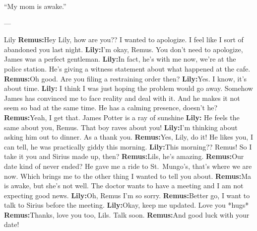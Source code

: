 \documentclass[12pt,twoside,openright]{memoir}
\begin{document}
``My mom is awake.''

---

Lily\newline
\textbf{Remus:}Hey Lily, how are you?? I wanted to apologize. I feel like I sort of abandoned you last night.\newline
\textbf{Lily:}I'm okay, Remus. You don't need to apologize, James was a perfect gentleman.\newline
\textbf{Lily:}In fact, he's with me now, we're at the police station. He's giving a witness statement about what happened at the cafe.\newline
\textbf{Remus:}Oh good. Are you filing a restraining order then?\newline
\textbf{Lily:}Yes. I know, it's about time. \newline
\textbf{Lily:} I think I was just hoping the problem would go away. Somehow James has convinced me to face reality and deal with it. And he makes it not seem so bad at the same time. He has a calming presence, doesn't he?\newline
\textbf{Remus:}Yeah, I get that. James Potter is a ray of sunshine \newline
\textbf{Lily:} He feels the same about you, Remus. That boy raves about you!\newline
\textbf{Lily:}I'm thinking about asking him out to dinner. As a thank you.\newline
\textbf{Remus:}Yes, Lily, do it! He likes you, I can tell, he was practically giddy this morning.\newline
\textbf{Lily:}This morning?? Remus! So I take it you and Sirius made up, then? \newline
\textbf{Remus:}Lils, he's amazing.\newline
\textbf{Remus:}Our date kind of never ended? He gave me a ride to St.\ Mungo's, that's where we are now. Which brings me to the other thing I wanted to tell you about.\newline
\textbf{Remus:}Ma is awake, but she's not well. The doctor wants to have a meeting and I am not expecting good news.\newline
\textbf{Lily:}Oh, Remus  I'm so sorry.\newline
\textbf{Remus:}Better go, I want to talk to Sirius before the meeting.\newline
\textbf{Lily:}Okay, keep me updated. Love you *hugs*\newline
\textbf{Remus:}Thanks, love you too, Lils. Talk soon.\newline
\textbf{Remus:}And good luck with your date! 
\end{document}
